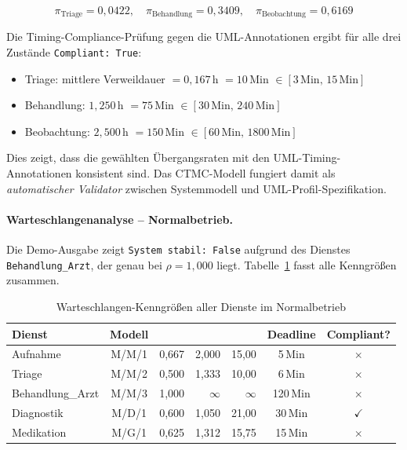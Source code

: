 ﻿\documentclass[a4paper,12pt]{scrreprt}
\theoremstyle{definition}
\begin{document}
\begin{equation}
	\pi_\text{Triage} = 0{,}0422, \quad
	\pi_\text{Behandlung} = 0{,}3409, \quad
	\pi_\text{Beobachtung} = 0{,}6169
\end{equation}

Die Timing-Compliance-Prüfung gegen die UML-Annotationen ergibt
für alle drei Zustände \texttt{Compliant: True}:
\begin{itemize}
	\item[-] Triage: mittlere Verweildauer $= 0{,}167$\,h $= 10$\,Min
	$\in [3\,\text{Min},\, 15\,\text{Min}]$ \checkmark
	\item[-] Behandlung: $1{,}250$\,h $= 75$\,Min
	$\in [30\,\text{Min},\, 240\,\text{Min}]$ \checkmark
	\item[-] Beobachtung: $2{,}500$\,h $= 150$\,Min
	$\in [60\,\text{Min},\, 1800\,\text{Min}]$ \checkmark
\end{itemize}

Dies zeigt, dass die gewählten Übergangsraten mit den UML-Timing-Annotationen
konsistent sind. Das CTMC-Modell fungiert damit als \emph{automatischer
	Validator} zwischen Systemmodell und UML-Profil-Spezifikation.

\paragraph{Warteschlangenanalyse -- Normalbetrieb.}
Die Demo-Ausgabe zeigt \texttt{System \newline stabil: False} aufgrund des
Dienstes \texttt{Behandlung\_Arzt}, der genau bei $\rho = 1{,}000$ liegt.
Tabelle~\ref{tab:wq-auswertung-normal} fasst alle Kenngrößen zusammen.

\begin{table}[H]
	\centering
	\begin{tabular}{@{}lcrrrcc@{}}
		\toprule
		\textbf{Dienst} & \textbf{Modell} & \boldmath{$\rho$} &
		\boldmath{$L$} & \boldmath{$W$ (Min)} & \textbf{Deadline} & \textbf{Compliant?} \\
		\midrule
		Aufnahme        & M/M/1 & 0{,}667 & 2{,}000 &  15{,}00 & 5\,Min   & $\times$ \\
		Triage          & M/M/2 & 0{,}500 & 1{,}333 &  10{,}00 & 6\,Min   & $\times$ \\
		Behandlung\_Arzt& M/M/3 & 1{,}000 & $\infty$& $\infty$ & 120\,Min & $\times$ \\
		Diagnostik      & M/D/1 & 0{,}600 & 1{,}050 &  21{,}00 & 30\,Min  & $\checkmark$ \\
		Medikation      & M/G/1 & 0{,}625 & 1{,}312 &  15{,}75 & 15\,Min  & $\times$ \\
		\bottomrule
	\end{tabular}
	\caption{Warteschlangen-Kenngrößen aller Dienste im Normalbetrieb}
	\label{tab:wq-auswertung-normal}
\end{table}
\end{document}
